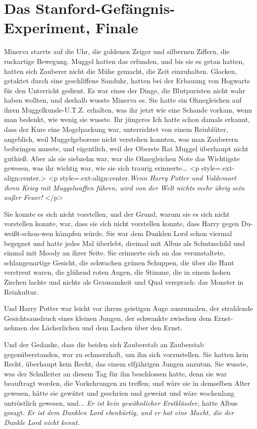 \chapter{Das Stanford-Gefängnis-Experiment, Finale}

Minerva starrte auf die Uhr, die goldenen Zeiger und silbernen Ziffern, die
ruckartige Bewegung. Muggel hatten das erfunden, und bis sie es getan hatten,
hatten sich Zauberer nicht die Mühe gemacht, die Zeit einzuhalten. Glocken,
getaktet durch eine geschliffene Sanduhr, hatten bei der Erbauung von Hogwarts
für den Unterricht gedient. Es war eines der Dinge, die Blutpuristen nicht wahr
haben wollten, und deshalb wusste Minerva es. Sie hatte ein \glqq
Ohnegleichen\grqq{} auf ihren Muggelkunde-U.T.Z. erhalten, was ihr jetzt wie
eine Schande vorkam, wenn man bedenkt, wie wenig sie wusste. Ihr jüngeres Ich
hatte schon damals erkannt, dass der Kurs eine Mogelpackung war, unterrichtet
von einem Reinblüter, angeblich, weil Muggelgeborene nicht verstehen konnten,
was man Zauberern beibringen musste, und eigentlich, weil der Oberste Rat Muggel
überhaupt nicht guthieß. Aber als sie siebzehn war, war die Ohnegleichen Note
das Wichtigste gewesen, was ihr wichtig war, wie sie sich traurig erinnerte...
<p style=\grqq{}.ext-align:center\grqq{}.> <p
style=\grqq{}.ext-align:center\grqq{}.\emph{Wenn Harry Potter und Voldemort
ihren Krieg mit Muggelwaffen führen, wird von der Welt nichts mehr übrig sein
außer Feuer!} </p>

Sie konnte es sich nicht vorstellen, und der Grund, warum sie es sich nicht
vorstellen konnte, war, dass sie sich nicht vorstellen konnte, dass Harry gegen
Du-weißt-schon-wen kämpfen würde. Sie war dem Dunklen Lord schon viermal
begegnet und hatte jedes Mal überlebt, dreimal mit Albus als Schutzschild und
einmal mit Moody an ihrer Seite. Sie erinnerte sich an das verunstaltete,
schlangenartige Gesicht, die schwachen grünen Schuppen, die über die Haut
verstreut waren, die glühend roten Augen, die Stimme, die in einem hohen Zischen
lachte und nichts als Grausamkeit und Qual versprach: das Monster in Reinkultur.

Und Harry Potter war leicht vor ihrem geistigen Auge auszumalen, der strahlende
Gesichtsausdruck eines kleinen Jungen, der schwankte zwischen dem Ernst-nehmen
des Lächerlichen und dem Lachen über den Ernst.

Und der Gedanke, dass die beiden sich Zauberstab an Zauberstab gegenüberstanden,
war zu schmerzhaft, um ihn sich vorzustellen. Sie hatten kein Recht, überhaupt
kein Recht, das einem elfjährigen Jungen anzutun. Sie wusste, was der
Schulleiter an diesem Tag für ihn beschlossen hatte, denn sie war beauftragt
worden, die Vorkehrungen zu treffen; und wäre sie in demselben Alter gewesen,
hätte sie gewütet und geschrien und geweint und wäre wochenlang untröstlich
gewesen, und... \emph{Er ist kein gewöhnlicher Erstklässler,} hatte Albus
gesagt. \emph{Er ist dem Dunklen Lord ebenbürtig, und er hat eine Macht, die der
Dunkle Lord nicht kennt.}

